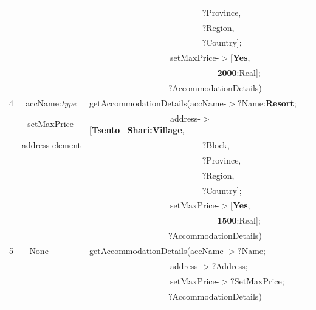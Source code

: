 \documentclass[a4paper,9pt]{beamer}
\begin{document}
{\begin{table} [tbph]
\begin{tabular}{|l|l|l|}
  &                   &$~~~~~~~~~~~~~~~~~~~~~~~~~~~~~~~~~~~~~~~~~~~~~~~~~~~~~~~~~~~~?$Province,  \\
  &                   &$~~~~~~~~~~~~~~~~~~~~~~~~~~~~~~~~~~~~~~~~~~~~~~~~~~~~~~~~~~~~?$Region, \\
  &                   &$~~~~~~~~~~~~~~~~~~~~~~~~~~~~~~~~~~~~~~~~~~~~~~~~~~~~~~~~~~~~?$Country]; \\ 
  &               &$~~~~~~~~~~~~~~~~~~~~~~~~~~~~~~~~~~~~~~~~~~~$setMaxPrice-$>$[\textbf{{\color{blue}Yes}},\\
  &                       &$~~~~~~~~~~~~~~~~~~~~~~~~~~~~~~~~~~~~~~~~~~~~~~~~~~~~~~~~~~~~~~~~~~~~$\textbf{{\color{blue}2000}}:Real]; \\ 
  &                       &$~~~~~~~~~~~~~~~~~~~~~~~~~~~~~~~~~~~~~~~~~~${\color{red}$?$AccommodationDetails})\\
\hline
 4&$~~$accName:\emph{type} & getAccommodationDetails(accName-$>?$Name:\textbf{{\color{blue}Resort}};\\
  &$~~~$setMaxPrice &$~~~~~~~~~~~~~~~~~~~~~~~~~~~~~~~~~~~~~~~~~~~$address-$>$[\textbf{{\color{blue}Tsento\_Shari:Village}}, \\
  &address element     &$~~~~~~~~~~~~~~~~~~~~~~~~~~~~~~~~~~~~~~~~~~~~~~~~~~~~~~~~~~~~?$Block, \\
  &                    &$~~~~~~~~~~~~~~~~~~~~~~~~~~~~~~~~~~~~~~~~~~~~~~~~~~~~~~~~~~~~?$Province,  \\
  &                    &$~~~~~~~~~~~~~~~~~~~~~~~~~~~~~~~~~~~~~~~~~~~~~~~~~~~~~~~~~~~~?$Region, \\
  &                    &$~~~~~~~~~~~~~~~~~~~~~~~~~~~~~~~~~~~~~~~~~~~~~~~~~~~~~~~~~~~~?$Country]; \\ 
  &                    &$~~~~~~~~~~~~~~~~~~~~~~~~~~~~~~~~~~~~~~~~~~~$setMaxPrice-$>$[\textbf{{\color{blue}Yes}},\\
  &              &$~~~~~~~~~~~~~~~~~~~~~~~~~~~~~~~~~~~~~~~~~~~~~~~~~~~~~~~~~~~~~~~~~~~~$\textbf{{\color{blue}1500}}:Real]; \\ 
  &                    &$~~~~~~~~~~~~~~~~~~~~~~~~~~~~~~~~~~~~~~~~~~${\color{red}$?$AccommodationDetails})\\
\hline
 5&$~~~~$None & getAccommodationDetails(accName-$>?$Name;\\
  &        &$~~~~~~~~~~~~~~~~~~~~~~~~~~~~~~~~~~~~~~~~~~~$address-$>?$Address; \\
  &       &$~~~~~~~~~~~~~~~~~~~~~~~~~~~~~~~~~~~~~~~~~~~$setMaxPrice-$>?$SetMaxPrice; \\
  &       &$~~~~~~~~~~~~~~~~~~~~~~~~~~~~~~~~~~~~~~~~~~${\color{red}$?$AccommodationDetails})\\
\hline
\end{tabular} 
\end{table}
}
\end{document}
